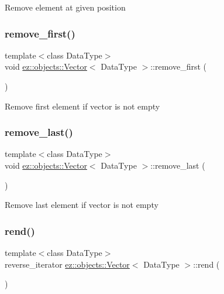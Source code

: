 Remove element at given position \mbox{\label{classez_1_1objects_1_1Vector_a6758995f2b561c6e078368fa85a8e552}} 
\subsubsection{\texorpdfstring{remove\+\_\+first()}{remove\_first()}}
{\footnotesize\ttfamily template$<$class Data\+Type$>$ \\
void \hyperlink{classez_1_1objects_1_1Vector}{ez\+::objects\+::\+Vector}$<$ Data\+Type $>$\+::remove\+\_\+first (\begin{DoxyParamCaption}{ }\end{DoxyParamCaption})\hspace{0.3cm}{\ttfamily [inline]}}

Remove first element if vector is not empty \mbox{\label{classez_1_1objects_1_1Vector_a76e84ee9ab9024011adb4ac57571c27a}} 
\subsubsection{\texorpdfstring{remove\+\_\+last()}{remove\_last()}}
{\footnotesize\ttfamily template$<$class Data\+Type$>$ \\
void \hyperlink{classez_1_1objects_1_1Vector}{ez\+::objects\+::\+Vector}$<$ Data\+Type $>$\+::remove\+\_\+last (\begin{DoxyParamCaption}{ }\end{DoxyParamCaption})\hspace{0.3cm}{\ttfamily [inline]}}

Remove last element if vector is not empty \mbox{\label{classez_1_1objects_1_1Vector_a1b39e82a877657e283dd4700597bfff5}} 
\subsubsection{\texorpdfstring{rend()}{rend()}}
{\footnotesize\ttfamily template$<$class Data\+Type$>$ \\
reverse\+\_\+iterator \hyperlink{classez_1_1objects_1_1Vector}{ez\+::objects\+::\+Vector}$<$ Data\+Type $>$\+::rend (\begin{DoxyParamCaption}{ }\end{DoxyParamCaption})\hspace{0.3cm}{\ttfamily [inline]}}

